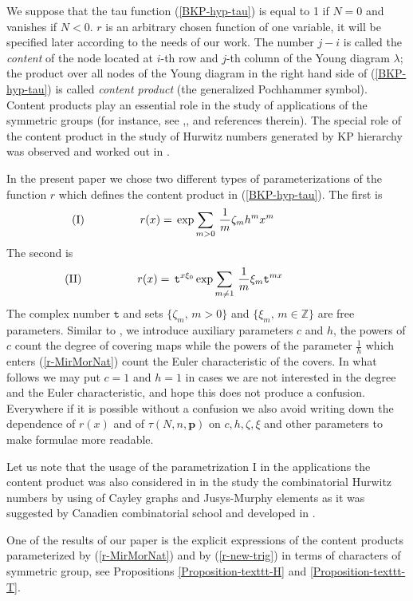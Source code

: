 \documentclass[a4paper,10pt]{article}
\newcommand{\bpow}{\mathbf{p}}
\theoremstyle{plain}
\theoremstyle{remark}
\def\be{\begin{equation}}
\def\ee{\end{equation}}
\begin{document}
We suppose that the tau function (\ref{BKP-hyp-tau}) is equal to 1 if $N=0$ and vanishes if $N<0$.
$r$ is an arbitrary chosen function of one variable, it will be specified later according to the needs of our work.
The number $j-i$ is called the \textit{content} of the node located at $i$-th row and $j$-th column of the Young diagram
$\lambda$; the product over all nodes of the Young diagram in the right hand side of (\ref{BKP-hyp-tau}) is called
 \textit{content product} (the generalized Pochhammer symbol). Content products play an essential role in the study of
 applications of the symmetric groups (for instance, see \cite{Goulden-Jackson-2008},\cite{HarnadMathieu-sept-2014},
\cite{Harnad-2014} and references therein). The special role of the content product in the study of Hurwitz numbers
generated by KP hierarchy was observed and worked out in \cite{GJ}.


In the present paper we chose two different types of parameterizations of the function $r$ which defines the content product
in (\ref{BKP-hyp-tau}). The first is
\be\label{r-MirMorNat}
\qquad({\rm I})\qquad\qquad\quad
r(x)= \,\exp \sum_{m>0}\,\frac 1m \zeta_m h^m x^m\,
\qquad\qquad\qquad\qquad
\ee
The second is
\be\label{r-new-trig}
\,({\rm II})\qquad\qquad\quad
r(x)= \, \texttt{t}^{x \xi_0 }\exp \sum_{m\neq 1}\,\frac 1m \xi_m \texttt{t}^{mx}\,
\qquad\qquad\qquad
\ee
The complex number $\texttt{t}$ and sets $\{\zeta_m,\,m > 0\}$ and $\{\xi_m,\,m\in\mathbb{Z} \}$
are free parameters. Similar to \cite{Okounkov-2000},\cite{Harnad-2014} we introduce auxiliary 
parameters $c$ and $h$, the powers of $c$ count the degree of covering maps while the powers of the
parameter $\frac 1h$ which enters (\ref{r-MirMorNat}) count the Euler characteristic
of the covers.
In what follows we may put $c=1$ and $h=1$ in cases we are not interested in the degree and the Euler characteristic,
and hope this does not produce a confusion. Everywhere if it is possible without a confusion we also avoid writing down
the dependence of $r(x)$ and of $\tau(N,n,\bpow)$ on $c,h,\zeta, \xi$ and other parameters to make formulae more readable.

Let us note that the usage of the parametrization I in the applications the content product was
also considered in \cite{Harnad-October-2014} in the study the combinatorial Hurwitz numbers by using of
Cayley graphs and Jusys-Murphy elements as it was suggested by Canadien combinatorial school \cite{GGPN} and
developed in \cite{Harnad-2014}.

One of the results of our paper is the explicit expressions of the content products parameterized by (\ref{r-MirMorNat}) and
by (\ref{r-new-trig}) in terms of characters of symmetric group, see Propositions \ref{Proposition-texttt-H}
and \ref{Proposition-texttt-T}.
\end{document}
